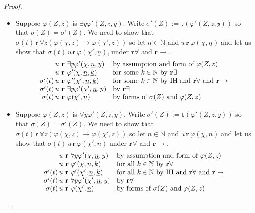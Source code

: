 \documentclass[10pt,a4paper]{amsart}
\theoremstyle{plain}
\theoremstyle{definition}
\renewcommand{\phi}{\varphi}
\newcommand{\dfn}{:=}
\theoremstyle{plain}
\theoremstyle{definition} %
\newcommand{\numeral}[1]{\underline{#1}}
\newcommand{\Nat}{\mathbb{N}}
\newcommand{\limp}{\to}
\newcommand{\realises}{\mathbf{r}}
\newcommand{\type}[1]{\mathtt t (#1)}
\begin{document}
\begin{proof}
\begin{itemize}
        \item Suppose $\phi(Z,z) $ is $\exists y \phi'(Z,z,y)$. Write $\sigma'(Z)\dfn \type{\phi'(Z,z,y)}$ so that $\sigma(Z) = \sigma'(Z)$.
        We need to show that $\sigma(t) \, \realises\, \forall z (\phi(\chi,z) \limp \phi(\chi',z))$ so let $n\in \Nat$ and $u\, \realises\, \phi(\chi,\numeral n)$ and let us show that $\sigma(t)\, u\,  \realises\, \phi(\chi',\numeral n)$, under $\realises\forall$ and $\realises\limp$. 
        \[
        \begin{array}{r@{\ \realises\ }ll}
             u & \exists y \phi'(\chi,\numeral n,y) & \text{by assumption and form of $\phi(Z,z)$} \\
             u & \phi' (\chi,\numeral n, \numeral k) & \text{for some $k\in \Nat$ by $\realises\exists$} \\
             \sigma'(t)\, u & \phi'(\chi',\numeral n, \numeral k) & \text{for some $k\in \Nat$ by IH and $\realises\forall$ and $\realises\limp$} \\
             \sigma'(t)\, u & \exists y \phi'(\chi', \numeral n, y) & \text{by $\realises\exists$} \\
             \sigma(t)\, u & \phi(\chi',\numeral n) & \text{by forms of $\sigma(Z)$ and $\phi(Z,z)$}             
        \end{array}
        \]
        \item Suppose $\phi(Z,z) $ is $\forall y \phi'(Z,z,y)$. Write $\sigma'(Z) \dfn \type{\phi'(Z,z,y)}$ so that $\sigma(Z) = \sigma'(Z)$.
        We need to show that $\sigma(t)\, \realises\, \forall z (\phi(\chi,z) \limp \phi(\chi',z))$ so let $n\in \Nat $ and $u\, \realises\, \phi(\chi,\numeral n)$ and let us show that $\sigma(t)\, u\, \realises\, \phi(\chi',\numeral n)$ under $\realises\forall$ and $\realises\limp$.
        \[
        \begin{array}[b]{r@{\ \realises\ }ll}
             u & \forall y \phi'(\chi,\numeral n,y) & \text{by assumption and form of $\phi(Z,z)$} \\
             u & \phi'(\chi,\numeral n, \numeral k) & \text{for all $k\in \Nat$ by $\realises \forall$} \\
             \sigma'(t)\, u & \phi'(\chi',\numeral n, \numeral k) & \text{for all $k\in \Nat$ by IH and $\realises\forall$ and $\realises\limp$} \\
             \sigma'(t)\, u & \forall y \phi'(\chi',\numeral n, y) & \text{by $\realises\forall$} \\
             \sigma(t)\, u & \phi(\chi', \numeral n) & \text{by forms of $\sigma(Z)$ and $\phi(Z,z)$} \tag*{\qed}
        \end{array}
        \]
    \end{itemize}
    \renewcommand{\qed}{}
\end{proof}
\end{document}
